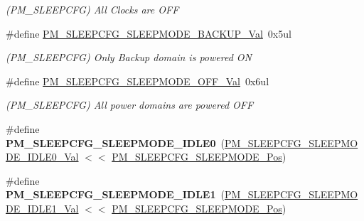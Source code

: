 \begin{DoxyCompactItemize}
\begin{DoxyCompactList}\small\item\em (P\+M\+\_\+\+S\+L\+E\+E\+P\+C\+F\+G) All Clocks are O\+F\+F \end{DoxyCompactList}\item 
\hypertarget{group___s_a_m_l21___p_m_ga4fa413e3dd29c199b7ad62c4f8f533ea}{}\#define \hyperlink{group___s_a_m_l21___p_m_ga4fa413e3dd29c199b7ad62c4f8f533ea}{P\+M\+\_\+\+S\+L\+E\+E\+P\+C\+F\+G\+\_\+\+S\+L\+E\+E\+P\+M\+O\+D\+E\+\_\+\+B\+A\+C\+K\+U\+P\+\_\+\+Val}~0x5ul\label{group___s_a_m_l21___p_m_ga4fa413e3dd29c199b7ad62c4f8f533ea}

\begin{DoxyCompactList}\small\item\em (P\+M\+\_\+\+S\+L\+E\+E\+P\+C\+F\+G) Only Backup domain is powered O\+N \end{DoxyCompactList}\item 
\hypertarget{group___s_a_m_l21___p_m_ga7f882d1a05a4bc12d6b2a16f5556d294}{}\#define \hyperlink{group___s_a_m_l21___p_m_ga7f882d1a05a4bc12d6b2a16f5556d294}{P\+M\+\_\+\+S\+L\+E\+E\+P\+C\+F\+G\+\_\+\+S\+L\+E\+E\+P\+M\+O\+D\+E\+\_\+\+O\+F\+F\+\_\+\+Val}~0x6ul\label{group___s_a_m_l21___p_m_ga7f882d1a05a4bc12d6b2a16f5556d294}

\begin{DoxyCompactList}\small\item\em (P\+M\+\_\+\+S\+L\+E\+E\+P\+C\+F\+G) All power domains are powered O\+F\+F \end{DoxyCompactList}\item 
\hypertarget{group___s_a_m_l21___p_m_ga00820f2feaed75a8b06cadc52e3dab7b}{}\#define {\bfseries P\+M\+\_\+\+S\+L\+E\+E\+P\+C\+F\+G\+\_\+\+S\+L\+E\+E\+P\+M\+O\+D\+E\+\_\+\+I\+D\+L\+E0}~(\hyperlink{group___s_a_m_l21___p_m_gaeac8be8e55515e28ce319c353cb7f1e2}{P\+M\+\_\+\+S\+L\+E\+E\+P\+C\+F\+G\+\_\+\+S\+L\+E\+E\+P\+M\+O\+D\+E\+\_\+\+I\+D\+L\+E0\+\_\+\+Val} $<$$<$ \hyperlink{group___s_a_m_l21___p_m_ga35bc67c3429373f2ad67992a2c731a59}{P\+M\+\_\+\+S\+L\+E\+E\+P\+C\+F\+G\+\_\+\+S\+L\+E\+E\+P\+M\+O\+D\+E\+\_\+\+Pos})\label{group___s_a_m_l21___p_m_ga00820f2feaed75a8b06cadc52e3dab7b}

\item 
\hypertarget{group___s_a_m_l21___p_m_ga716c5158a79b9ea0bb15ebf1bec3d901}{}\#define {\bfseries P\+M\+\_\+\+S\+L\+E\+E\+P\+C\+F\+G\+\_\+\+S\+L\+E\+E\+P\+M\+O\+D\+E\+\_\+\+I\+D\+L\+E1}~(\hyperlink{group___s_a_m_l21___p_m_gaffca82a32fcc77efc796ad8113fc2624}{P\+M\+\_\+\+S\+L\+E\+E\+P\+C\+F\+G\+\_\+\+S\+L\+E\+E\+P\+M\+O\+D\+E\+\_\+\+I\+D\+L\+E1\+\_\+\+Val} $<$$<$ \hyperlink{group___s_a_m_l21___p_m_ga35bc67c3429373f2ad67992a2c731a59}{P\+M\+\_\+\+S\+L\+E\+E\+P\+C\+F\+G\+\_\+\+S\+L\+E\+E\+P\+M\+O\+D\+E\+\_\+\+Pos})\label{group___s_a_m_l21___p_m_ga716c5158a79b9ea0bb15ebf1bec3d901}


\end{DoxyCompactItemize}
